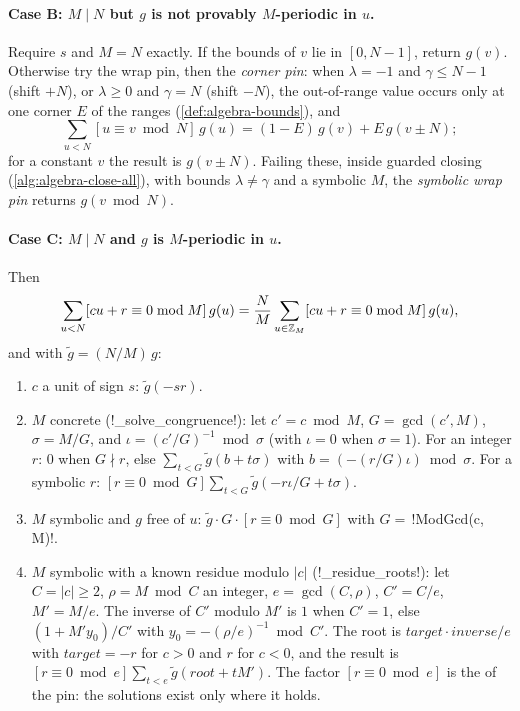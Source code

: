 \paragraph{Case B: $M\mid N$ but $g$ is not provably $M$-periodic in $u$.} Require $s$ and $M=N$ exactly. If the bounds of $v$ lie in $[0,N-1]$, return $g(v)$. Otherwise try the wrap pin, then the \emph{corner pin}: when $\lambda=-1$ and $\gamma\le N-1$ (shift $+N$), or $\lambda\ge 0$ and $\gamma=N$ (shift $-N$), the out-of-range value occurs only at one corner $E$ of the ranges (\cref{def:algebra-bounds}), and
\begin{equation}
\sum_{u<N}[u\equiv v\bmod N]\,g(u)=(1-E)\,g(v)+E\,g(v\pm N);
\end{equation}
for a constant $v$ the result is $g(v\pm N)$. Failing these, inside guarded closing (\cref{alg:algebra-close-all}), with bounds $\lambda\ne\gamma$ and a symbolic $M$, the \emph{symbolic wrap pin} returns $g(v\bmod N)$.

\paragraph{Case C: $M\mid N$ and $g$ is $M$-periodic in $u$.} Then
\begin{equation}
\sum_{u<N}[cu+r\equiv 0\bmod M]\,g(u)=\frac{N}{M}\sum_{u\in\mathbb{Z}_{M}}[cu+r\equiv 0\bmod M]\,g(u),
\end{equation}
and with $\tilde g=(N/M)\,g$:
\begin{enumerate}
\item $c$ a unit of sign $s$: $\tilde g(-s r)$.
\item $M$ concrete (\py!_solve_congruence!): let $c'=c\bmod M$, $G=\gcd(c',M)$, $\sigma=M/G$, and $\iota=(c'/G)^{-1}\bmod\sigma$ (with $\iota=0$ when $\sigma=1$). For an integer $r$: $0$ when $G\nmid r$, else $\sum_{t<G}\tilde g(b+t\sigma)$ with $b=(-(r/G)\iota)\bmod\sigma$. For a symbolic $r$: $[r\equiv 0\bmod G]\sum_{t<G}\tilde g(-r\iota/G+t\sigma)$.
\item $M$ symbolic and $g$ free of $u$: $\tilde g\cdot G\cdot[r\equiv 0\bmod G]$ with $G=$\,\py!ModGcd(c, M)!.
\item $M$ symbolic with a known residue modulo $|c|$ (\py!_residue_roots!): let $C=|c|\ge 2$, $\rho=M\bmod C$ an integer, $e=\gcd(C,\rho)$, $C'=C/e$, $M'=M/e$. The inverse of $C'$ modulo $M'$ is $1$ when $C'=1$, else $(1+M'y_0)/C'$ with $y_0=-(\rho/e)^{-1}\bmod C'$. The root is $\mathit{target}\cdot\mathit{inverse}/e$ with $\mathit{target}=-r$ for $c>0$ and $r$ for $c<0$, and the result is $[r\equiv 0\bmod e]\sum_{t<e}\tilde g(\mathit{root}+tM')$. The factor $[r\equiv 0\bmod e]$ is the  of the pin: the solutions exist only where it holds.
\end{enumerate}

